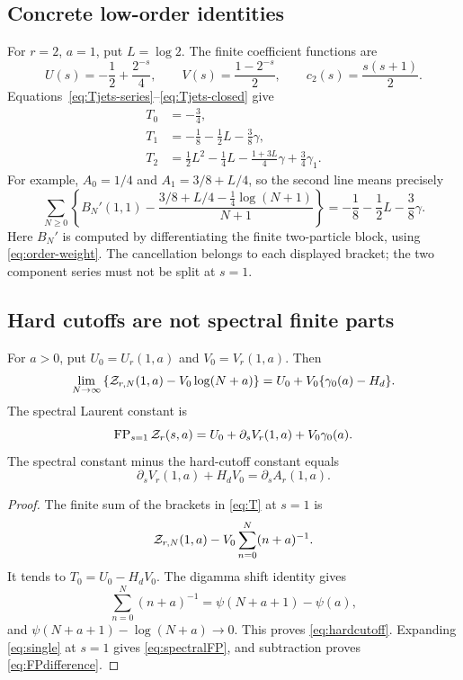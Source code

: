 \subsection{Concrete low-order identities}
For $r=2$, $a=1$, put $L=\log2$. The finite coefficient functions are
\[
 U(s)=-\frac12+\frac{2^{-s}}4,\qquad
 V(s)=\frac{1-2^{-s}}2,\qquad c_2(s)=\frac{s(s+1)}2.
\]
Equations~\eqref{eq:Tjets-series}--\eqref{eq:Tjets-closed} give
\begin{align}
 T_0&=-\frac34,\label{eq:T0example}\\
 T_1&=-\frac18-\frac12L-\frac38\gamma,\label{eq:T1example}\\
 T_2&=\frac12L^2-\frac14L-\frac{1+3L}{4}\gamma
          +\frac34\gamma_1.\label{eq:T2example}
\end{align}
For example, $A_0=1/4$ and $A_1=3/8+L/4$, so the second line means
precisely
\begin{equation}\label{eq:T1seriesexample}
 \sum_{N\ge0}\left\{B_N'(1,1)
 -\frac{3/8+L/4-\tfrac14\log(N+1)}{N+1}\right\}
       =-\frac18-\frac12L-\frac38\gamma.
\end{equation}
Here $B_N'$ is computed by differentiating the finite two-particle block,
using \eqref{eq:order-weight}. The cancellation belongs to each displayed
bracket; the two component series must not be split at $s=1$.

\subsection{Hard cutoffs are not spectral finite parts}
\begin{corollary}
\label{cor:cutoff}
For $a>0$, put $U_0=U_r(1,a)$ and $V_0=V_r(1,a)$. Then
\begin{equation}\label{eq:hardcutoff}
 \lim_{N\to\infty}\left\{\mathcal Z_{r,N}(1,a)-V_0\log(N+a)\right\}
       =U_0+V_0\{\gamma_0(a)-H_d\}.
\end{equation}
The spectral Laurent constant is
\begin{equation}\label{eq:spectralFP}
 \operatorname{FP}_{s=1}\mathcal Z_r(s,a)=U_0+\partial_sV_r(1,a)+V_0\gamma_0(a).
\end{equation}
The spectral constant minus the hard-cutoff constant equals
\begin{equation}\label{eq:FPdifference}
 \partial_sV_r(1,a)+H_dV_0=\partial_sA_r(1,a).
\end{equation}
\end{corollary}
\begin{proof}
The finite sum of the brackets in \eqref{eq:T} at $s=1$ is
\[
 \mathcal Z_{r,N}(1,a)-V_0\sum_{n=0}^N(n+a)^{-1}.
\]
It tends to $T_0=U_0-H_dV_0$. The digamma shift identity gives
\[
 \sum_{n=0}^N(n+a)^{-1}=\psi(N+a+1)-\psi(a),
\]
and $\psi(N+a+1)-\log(N+a)\to0$. This proves
\eqref{eq:hardcutoff}. Expanding \eqref{eq:single} at $s=1$ gives
\eqref{eq:spectralFP}, and subtraction proves \eqref{eq:FPdifference}.
\end{proof}

